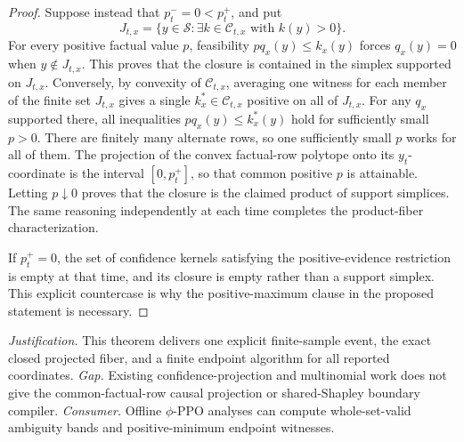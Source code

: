 \documentclass{article}
\begin{document}
\begin{proof}
Suppose instead that \(p_t^-=0<p_t^+\), and put
\[
 J_{t,x}=\{y\in\mathcal S:\exists k\in\mathcal C_{t,x}
                    \text{ with }k(y)>0\}.
\]
For every positive factual value \(p\), feasibility \(pq_x(y)\le k_x(y)\) forces \(q_x(y)=0\) when \(y\notin J_{t,x}\).  This proves that the closure is contained in the simplex supported on \(J_{t,x}\).  Conversely, by convexity of \(\mathcal C_{t,x}\), averaging one witness for each member of the finite set \(J_{t,x}\) gives a single \(k_x^*\in\mathcal C_{t,x}\) positive on all of \(J_{t,x}\).  For any \(q_x\) supported there, all inequalities \(pq_x(y)\le k_x^*(y)\) hold for sufficiently small \(p>0\).  There are finitely many alternate rows, so one sufficiently small \(p\) works for all of them.  The projection of the convex factual-row polytope onto its \(y_t\)-coordinate is the interval \([0,p_t^+]\), so that common positive \(p\) is attainable.  Letting \(p\downarrow0\) proves that the closure is the claimed product of support simplices.  The same reasoning independently at each time completes the product-fiber characterization.

If \(p_t^+=0\), the set of confidence kernels satisfying the positive-evidence restriction is empty at that time, and its closure is empty rather than a support simplex.  This explicit countercase is why the positive-maximum clause in the proposed statement is necessary.
\end{proof}
\par\smallskip\noindent \textit{Justification.} This theorem delivers one explicit finite-sample event, the exact closed projected fiber, and a finite endpoint algorithm for all reported coordinates. \textit{Gap.} Existing confidence-projection and multinomial work does not give the common-factual-row causal projection or shared-Shapley boundary compiler. \textit{Consumer.} Offline \(\phi\)-PPO analyses can compute whole-set-valid ambiguity bands and positive-minimum endpoint witnesses.
\end{document}
